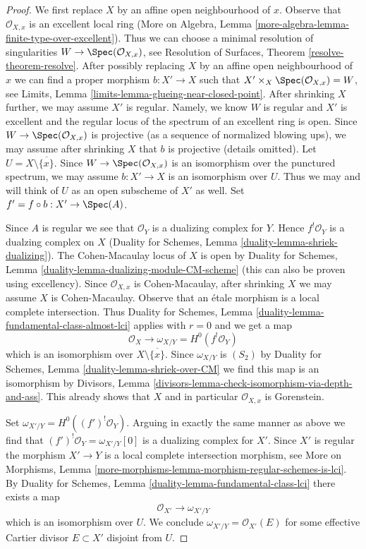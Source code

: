 \begin{proof}
We first replace $X$ by an affine open neighbourhood of $x$.
Observe that $\mathcal{O}_{X, x}$ is an excellent local ring
(More on Algebra, Lemma \ref{more-algebra-lemma-finite-type-over-excellent}).
Thus we can choose a minimal resolution of singularities
$W \to \Spec(\mathcal{O}_{X, x})$, see
Resolution of Surfaces, Theorem \ref{resolve-theorem-resolve}.
After possibly replacing $X$ by an affine open neighbourhood of $x$
we can find a proper morphism $b : X' \to X$ such that
$X' \times_X \Spec(\mathcal{O}_{X, x}) = W$, see
Limits, Lemma \ref{limits-lemma-glueing-near-closed-point}.
After shrinking $X$ further, we may assume $X'$ is regular.
Namely, we know $W$ is regular and $X'$ is excellent
and the regular locus of the spectrum of an excellent ring is open.
Since $W \to \Spec(\mathcal{O}_{X, x})$ is projective
(as a sequence of normalized blowing ups), we may assume
after shrinking $X$ that $b$ is projective (details omitted).
Let $U = X \setminus \overline{\{x\}}$.
Since $W \to \Spec(\mathcal{O}_{X, x})$ is an isomorphism over the
punctured spectrum, we may assume $b : X' \to X$ is an isomorphism over $U$.
Thus we may and will think of $U$ as an open subscheme of $X'$ as well.
Set $f' = f \circ b : X' \to \Spec(A)$.

\medskip\noindent
Since $A$ is regular we see that $\mathcal{O}_Y$ is a dualizing complex for $Y$.
Hence $f^!\mathcal{O}_Y$ is a dualzing complex on $X$
(Duality for Schemes, Lemma \ref{duality-lemma-shriek-dualizing}).
The Cohen-Macaulay locus of $X$ is open by
Duality for Schemes, Lemma \ref{duality-lemma-dualizing-module-CM-scheme}
(this can also be proven using excellency).
Since $\mathcal{O}_{X, x}$ is Cohen-Macaulay, after shrinking
$X$ we may assume $X$ is Cohen-Macaulay.
Observe that an \'etale morphism is a local complete intersection.
Thus
Duality for Schemes, Lemma \ref{duality-lemma-fundamental-class-almost-lci}
applies with $r = 0$ and we get a map
$$
\mathcal{O}_X \longrightarrow \omega_{X/Y} = H^0(f^!\mathcal{O}_Y)
$$
which is an isomorphism over $X \setminus \overline{\{x\}}$.
Since $\omega_{X/Y}$ is $(S_2)$ by
Duality for Schemes, Lemma \ref{duality-lemma-shriek-over-CM}
we find this map is an isomorphism by
Divisors, Lemma \ref{divisors-lemma-check-isomorphism-via-depth-and-ass}.
This already shows that $X$ and in particular $\mathcal{O}_{X, x}$ is
Gorenstein.

\medskip\noindent
Set $\omega_{X'/Y} = H^0((f')^!\mathcal{O}_Y)$. Arguing in exactly the
same manner as above we find that $(f')^!\mathcal{O}_Y = \omega_{X'/Y}[0]$
is a dualizing complex for $X'$. Since $X'$ is regular
the morphism $X' \to Y$ is a local complete intersection morphism, see
More on Morphisms, Lemma
\ref{more-morphisms-lemma-morphism-regular-schemes-is-lci}.
By Duality for Schemes, Lemma \ref{duality-lemma-fundamental-class-lci}
there exists a map
$$
\mathcal{O}_{X'} \longrightarrow \omega_{X'/Y}
$$
which is an isomorphism over $U$. We conclude
$\omega_{X'/Y} = \mathcal{O}_{X'}(E)$ for some effective
Cartier divisor $E \subset X'$ disjoint from $U$.


\end{proof}
